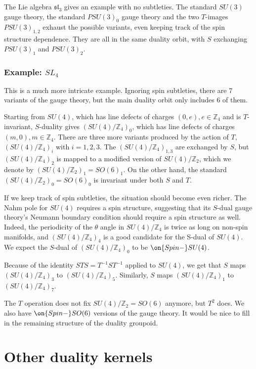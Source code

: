 \documentclass[11pt,reqno]{amsart}
\theoremstyle{plain}
\numberwithin{equation}{section}
\newcommand{\Z}{\mathbb{Z}}
\theoremstyle{definition}
\begin{document}
The Lie algebra $\mathfrak{sl}_3$ gives an example with no
subtleties. The standard $SU(3)$ gauge theory, the standard $PSU(3)_0$
gauge theory and the two $T$-images $PSU(3)_{1,2}$ exhaust the
possible variants, even keeping track of the spin structure
dependence. They are all in the same duality orbit, with $S$
exchanging $PSU(3)_{1}$ and $PSU(3)_{2}$.

\subsubsection{Example: $SL_4$}

This is a much more intricate example. Ignoring spin subtleties, there
are $7$ variants of the gauge theory, but the main duality orbit only
includes $6$ of them.

Starting from $SU(4)$, which has line defects of charges $(0,e), e \in
\Z_4$ and is $T$-invariant, $S$-duality gives $(SU(4)/\Z_4)_0$, which
has line defects of charges $(m,0), m \in \Z_4$. There are three more
variants produced by the action of $T$, $(SU(4)/\Z_4)_{i}$ with
$i=1,2,3$. The $(SU(4)/\Z_4)_{1,3}$ are exchanged by $S$, but
$(SU(4)/\Z_4)_{2}$ is mapped to a modified version of $SU(4)/\Z_2$,
which we denote by $(SU(4)/\Z_2)_{1}=SO(6)_1$.  On the other hand, the
standard $(SU(4)/\Z_2)_{0}= SO(6)_0$ is invariant under both $S$ and
$T$.

If we keep track of spin subtleties, the situation should become even
richer. The Nahm pole for $SU(4)$ requires a spin structure,
suggesting that its $S$-dual gauge theory's Neumann boundary condition
should require a spin structure as well. Indeed, the periodicity of
the $\theta$ angle in $SU(4)/\Z_4$ is twice as long on non-spin manifolds, and
$(SU(4)/\Z_4)_{4}$ is a good candidate for the S-dual of $SU(4)$. We
expect the $S$-dual of $(SU(4)/\Z_4)_{0}$ to be $\on{Spin-}SU(4)$.

Because of the identity $STS = T^{-1} S T^{-1}$ applied to $SU(4)$, we
get that $S$ maps $(SU(4)/\Z_4)_{3}$ to $(SU(4)/\Z_4)_{5}$.
Similarly, $S$ maps $(SU(4)/\Z_4)_{1}$ to $(SU(4)/\Z_4)_{7}$.

The $T$ operation does not fix $SU(4)/\Z_2=SO(6)$ anymore, but $T^2$
does. We also have $\on{Spin-}SO(6)$ versions of the gauge
theory. It would be nice to fill in the remaining structure of the
duality groupoid.

\section{Other duality kernels}    \label{other}
\end{document}
